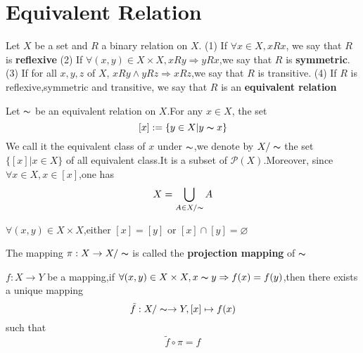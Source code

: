 \documentclass{book}
\begin{document}
\section{Equivalent Relation}
\begin{definitionenv}
    Let $X$ be a set and $R$ a binary relation on $X$.
    \newline
    (1) If $\forall x \in X ,xRx$, we say that $R$ is \textbf{reflexive}
    \newline
    (2) If $\forall (x,y) \in X\times X,xRy\Rightarrow yRx$,we say that $R$ is \textbf{symmetric}.
    \newline
    (3) If for all $x,y,z$ of $X$, $xRy\wedge yRz\Rightarrow xRz$,we say that $R$ is transitive.
    \newline
    (4) If $R$ is reflexive,symmetric and transitive, we say that $R$ is an \textbf{equivalent relation}

\end{definitionenv}
\begin{definitionenv}
    Let $\thicksim$ be an equivalent relation on $X$.For any $x\in X$, the set $$[x]:=\{y\in X|y\thicksim x\}$$ We call it the equivalent class of $x$ under $\thicksim$,we denote by $X/\thicksim$ the set $\{[x]|x\in X\}$ of all equivalent class.It is a subset of $\mathcal{P} (X)$.Moreover, since $\forall x\in X,x\in [x] $,one has $$X=\bigcup_{A\in X/\thicksim}A $$
\end{definitionenv}
\begin{propositionenv}
    $\forall (x,y)\in X\times X$,either $[x]=[y]$ or $[x]\cap [y]=\varnothing$
\end{propositionenv}
\begin{definitionenv}
    The mapping $\pi :X\rightarrow X/\thicksim$ is called the \textbf{projection mapping} of $\thicksim$
\end{definitionenv}
\begin{propositionenv}
    $f:X\rightarrow Y$ be a mapping,if $\forall (x,y)\in X\times X,x\thicksim y\Rightarrow f(x)=f(y)$,then there exists a unique mapping$$\tilde{f}:X/\thicksim\rightarrow Y, [x]\mapsto f(x)$$such that $$\tilde{f}\circ \pi =f$$
\end{propositionenv}
\end{document}
